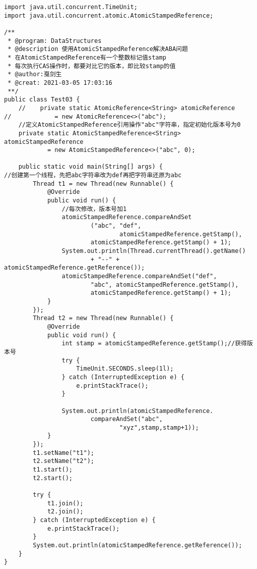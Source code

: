 \documentclass[a4paper]{report}
\begin{document}
\begin{Verbatim}[frame=single,numbersep=5pt,xleftmargin=1.5em,xrightmargin=1.5em]
import java.util.concurrent.TimeUnit;
import java.util.concurrent.atomic.AtomicStampedReference;

/**
 * @program: DataStructures
 * @description 使用AtomicStampedReference解决ABA问题
 * 在AtomicStampedReference有一个整数标记值stamp
 * 每次执行CAS操作时，都要对比它的版本，即比较stamp的值
 * @author:戛剑生
 * @creat: 2021-03-05 17:03:16
 **/
public class Test03 {
    //    private static AtomicReference<String> atomicReference
//            = new AtomicReference<>("abc");
    //定义AtomicStampedReference引用操作"abc"字符串，指定初始化版本号为0
    private static AtomicStampedReference<String> atomicStampedReference
            = new AtomicStampedReference<>("abc", 0);

    public static void main(String[] args) {
//创建第一个线程，先把abc字符串改为def再把字符串还原为abc
        Thread t1 = new Thread(new Runnable() {
            @Override
            public void run() {
                //每次修改，版本号加1
                atomicStampedReference.compareAndSet
                        ("abc", "def",
                                atomicStampedReference.getStamp(),
                        atomicStampedReference.getStamp() + 1);
                System.out.println(Thread.currentThread().getName()
                        + "--" + atomicStampedReference.getReference());
                atomicStampedReference.compareAndSet("def",
                        "abc", atomicStampedReference.getStamp(),
                        atomicStampedReference.getStamp() + 1);
            }
        });
        Thread t2 = new Thread(new Runnable() {
            @Override
            public void run() {
                int stamp = atomicStampedReference.getStamp();//获得版本号
                try {
                    TimeUnit.SECONDS.sleep(1l);
                } catch (InterruptedException e) {
                    e.printStackTrace();
                }

                System.out.println(atomicStampedReference.
                        compareAndSet("abc",
                                "xyz",stamp,stamp+1));
            }
        });
        t1.setName("t1");
        t2.setName("t2");
        t1.start();
        t2.start();

        try {
            t1.join();
            t2.join();
        } catch (InterruptedException e) {
            e.printStackTrace();
        }
        System.out.println(atomicStampedReference.getReference());
    }
}\end{Verbatim}
\end{document}
